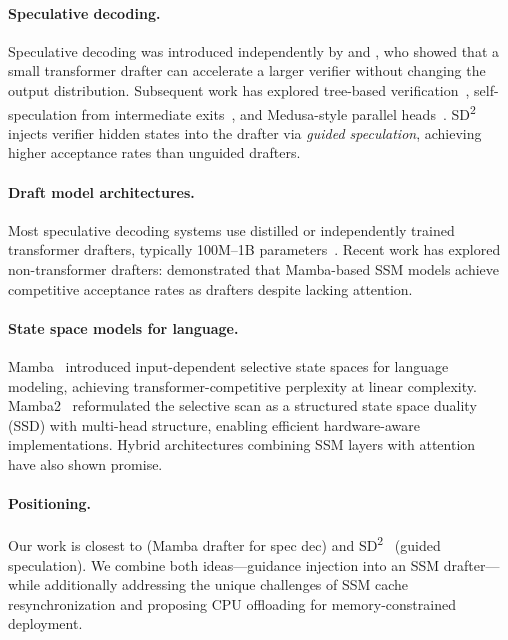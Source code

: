 \paragraph{Speculative decoding.}
Speculative decoding was introduced independently by \citet{leviathan2023fast} and \citet{chen2023accelerating}, who showed that a small transformer drafter can accelerate a larger verifier without changing the output distribution.
Subsequent work has explored tree-based verification~\citep{miao2024specinfer}, self-speculation from intermediate exits~\citep{zhang2024draft}, and Medusa-style parallel heads~\citep{cai2024medusa}.
SD\textsuperscript{2}~\citep{sun2024spectr} injects verifier hidden states into the drafter via \emph{guided speculation}, achieving higher acceptance rates than unguided drafters.

\paragraph{Draft model architectures.}
Most speculative decoding systems use distilled or independently trained transformer drafters, typically 100M--1B parameters~\citep{leviathan2023fast, zhou2024distillspec}.
Recent work has explored non-transformer drafters: \citet{choi2025mamba} demonstrated that Mamba-based SSM models achieve competitive acceptance rates as drafters despite lacking attention.

\paragraph{State space models for language.}
Mamba~\citep{gu2023mamba} introduced input-dependent selective state spaces for language modeling, achieving transformer-competitive perplexity at linear complexity.
Mamba2~\citep{dao2024transformers} reformulated the selective scan as a structured state space duality (SSD) with multi-head structure, enabling efficient hardware-aware implementations.
Hybrid architectures combining SSM layers with attention~\citep{lieber2024jamba} have also shown promise.

\paragraph{Positioning.}
Our work is closest to \citet{choi2025mamba} (Mamba drafter for spec dec) and SD\textsuperscript{2}~\citep{sun2024spectr} (guided speculation).  We combine both ideas---guidance injection into an SSM drafter---while additionally addressing the unique challenges of SSM cache resynchronization and proposing CPU offloading for memory-constrained deployment.
